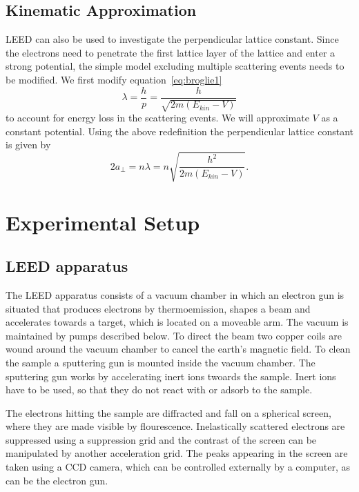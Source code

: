 \documentclass[a4paper,10pt]{scrartcl}
\begin{document}
\subsection{Kinematic Approximation}

LEED can also be used to investigate the perpendicular lattice constant. Since the electrons need to penetrate the first lattice layer of the lattice and enter a strong potential, the simple model excluding multiple scattering events needs to be modified. We first modify equation~\eqref{eq:broglie1}
\begin{equation}
\lambda = \frac{h}{p} = \frac{h}{\sqrt{2m(E_{kin}-V)}}
\end{equation}
to account for energy loss in the scattering events. We will approximate $V$ as a constant potential. Using the above redefinition the perpendicular lattice constant is given by
\begin{equation}
2a_{\perp} = n\lambda = n \sqrt{\frac{h^{2}}{2m(E_{kin}-V)}}.
\end{equation}

\section{Experimental Setup}

\subsection{LEED apparatus}

The LEED apparatus consists of a vacuum chamber in which an electron gun is situated that produces electrons by thermoemission, shapes a beam and accelerates towards a target, which is located on a moveable arm. The vacuum is maintained by pumps described below. To direct the beam two copper coils are wound around the vacuum chamber to cancel the earth's magnetic field. To clean the sample a sputtering gun is mounted inside the vacuum chamber. The sputtering gun works by accelerating inert ions twoards the sample. Inert ions have to be used, so that they do not react with or adsorb to the sample.

The electrons hitting the sample are diffracted and fall on a spherical screen, where they are made visible by flourescence. Inelastically scattered electrons are suppressed using a suppression grid and the contrast of the screen can be manipulated by another acceleration grid. The peaks appearing in the screen are taken using a CCD camera, which can be controlled externally by a computer, as can be the electron gun.
\end{document}
